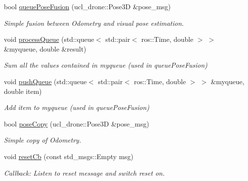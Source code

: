 \begin{DoxyCompactItemize}
bool \hyperlink{classPoseEstimator_ace23bcfb7a0c364d6002ea90b230c89c}{queue\+Pose\+Fusion} (ucl\+\_\+drone\+::\+Pose3D \&pose\+\_\+msg)
\begin{DoxyCompactList}\small\item\em Simple fusion between Odometry and visual pose estimation. \end{DoxyCompactList}\item 
\mbox{\label{classPoseEstimator_a7c29c13f657b0c088051c98a35ac2aa1}} 
void \hyperlink{classPoseEstimator_a7c29c13f657b0c088051c98a35ac2aa1}{process\+Queue} (std\+::queue$<$ std\+::pair$<$ ros\+::\+Time, double $>$ $>$ \&myqueue, double \&result)
\begin{DoxyCompactList}\small\item\em Sum all the values contained in myqueue (used in queue\+Pose\+Fusion) \end{DoxyCompactList}\item 
\mbox{\label{classPoseEstimator_a64a7fd9af5c69a24ece7b3939ada5f82}} 
void \hyperlink{classPoseEstimator_a64a7fd9af5c69a24ece7b3939ada5f82}{push\+Queue} (std\+::queue$<$ std\+::pair$<$ ros\+::\+Time, double $>$ $>$ \&myqueue, double item)
\begin{DoxyCompactList}\small\item\em Add item to myqueue (used in queue\+Pose\+Fusion) \end{DoxyCompactList}\item 
\mbox{\label{classPoseEstimator_aa4008a36554351285abf7ce0412ffa92}} 
bool \hyperlink{classPoseEstimator_aa4008a36554351285abf7ce0412ffa92}{pose\+Copy} (ucl\+\_\+drone\+::\+Pose3D \&pose\+\_\+msg)
\begin{DoxyCompactList}\small\item\em Simple copy of Odometry. \end{DoxyCompactList}\item 
\mbox{\label{classPoseEstimator_a9e57a0eb0cc230f076819483f7c267ad}} 
void \hyperlink{classPoseEstimator_a9e57a0eb0cc230f076819483f7c267ad}{reset\+Cb} (const std\+\_\+msgs\+::\+Empty msg)
\begin{DoxyCompactList}\small\item\em Callback\+: Listen to reset message and switch reset on. \end{DoxyCompactList}\end{DoxyCompactItemize}
